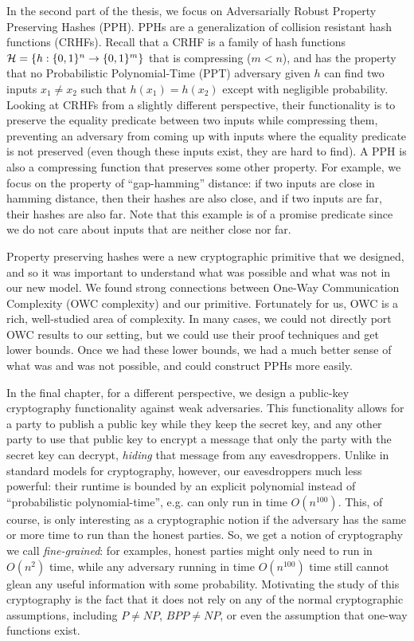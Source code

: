 In the second part of the thesis, we focus on Adversarially Robust Property Preserving Hashes (PPH).
PPHs are a generalization of collision resistant hash functions (CRHFs). Recall that a CRHF is a family of hash functions ${\cal H} = \{ h:\{0,1\}^n \to \{0,1\}^m \}$ that is compressing ($m < n$), and has the property that no Probabilistic Polynomial-Time (PPT) adversary given $h$ can find two inputs $x_1 \neq x_2$ such that $h(x_1) = h(x_2)$ except with negligible probability. Looking at CRHFs from a slightly different perspective, their functionality is to preserve the equality predicate between two inputs while compressing them, preventing an adversary from coming up with inputs where the equality predicate is not preserved  (even though these inputs exist, they are hard to find). A PPH is also a compressing function that preserves some other property. For example, we focus on the property of ``gap-hamming'' distance: if two inputs are close in hamming distance, then their hashes are also close, and if two inputs are far, their hashes are also far. Note that this example is of a promise predicate since we do not care about inputs that are neither close nor far.

Property preserving hashes were a new cryptographic primitive that we designed, and so it was important to understand what was possible and what was not in our new model. We found strong connections between One-Way Communication Complexity (OWC complexity) and our primitive. Fortunately for us, OWC is a rich, well-studied area of complexity. In many cases, we could not directly port OWC results to our setting, but we could use their proof techniques and get lower bounds. Once we had these lower bounds, we had a much better sense of what was and was not possible, and could construct PPHs more easily.

In the final chapter, for a different perspective, we design a public-key cryptography functionality against weak adversaries. This functionality allows for a party to publish a public key while they keep the secret key, and any other party to use that public key to encrypt a message that only the party with the secret key can decrypt, \emph{hiding} that message from any eavesdroppers. Unlike in standard models for cryptography, however, our eavesdroppers much less powerful: their runtime is bounded by an explicit polynomial instead of ``probabilistic polynomial-time'', e.g. can only run in time $O(n^{100})$. This, of course, is only interesting as a cryptographic notion if the adversary has the same or more time to run than the honest parties. So, we get a notion of cryptography we call \emph{fine-grained}: for examples, honest parties might only need to run in $O(n^2)$ time, while any adversary running in time $O(n^{100})$ time still cannot glean any useful information with some probability. Motivating the study of this cryptography is the fact that it does not rely on any of the normal cryptographic assumptions, including $P \neq NP$, $BPP \neq NP$, or even the assumption that one-way functions exist.

